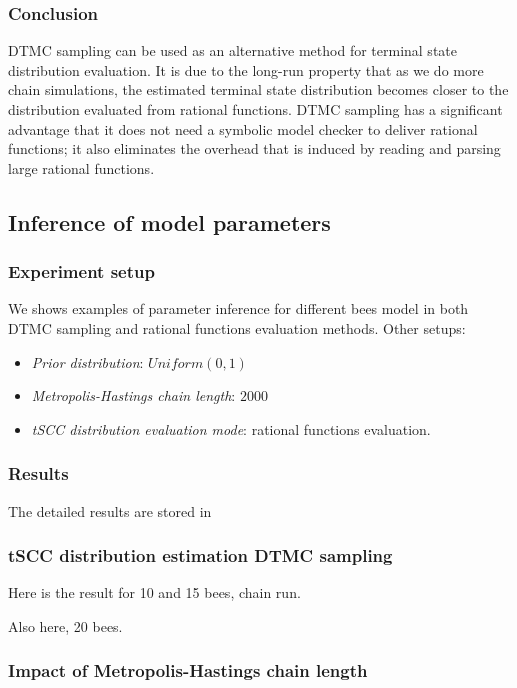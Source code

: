 \documentclass[12pt]{article}
\theoremstyle{definition}
\begin{document}
\subsubsection{Conclusion}
DTMC sampling can be used as an alternative method for terminal state
distribution evaluation. It is due to the long-run property that as we do more
chain simulations, the estimated terminal state distribution becomes closer to
the distribution evaluated from rational functions. DTMC sampling has a
significant advantage that it does not need a symbolic model checker to deliver
rational functions; it also eliminates the overhead that is induced by reading
and parsing large rational functions.


\subsection{Inference of model parameters}
\subsubsection{Experiment setup}
We shows examples of parameter inference for different bees model in both DTMC
sampling and rational functions evaluation methods. Other setups:
\begin{itemize}
\item \textit{Prior distribution}: $Uniform(0, 1)$
\item \textit{Metropolis-Hastings chain length}: $2000$
\item \textit{tSCC distribution evaluation mode}: rational functions evaluation.
\end{itemize}


\subsubsection{Results}
The detailed results are stored in

\subsubsection{tSCC distribution estimation DTMC sampling}
Here is the result for 10 and 15 bees, chain run.


Also here, 20 bees.


\subsubsection{Impact of Metropolis-Hastings chain length}
\end{document}
